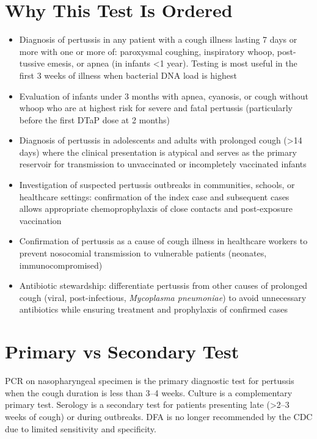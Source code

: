 \section*{Why This Test Is Ordered}
\begin{itemize}
  \item Diagnosis of pertussis in any patient with a cough illness lasting 7 days or more with one or more of: paroxysmal coughing, inspiratory whoop, post-tussive emesis, or apnea (in infants <1 year). Testing is most useful in the first 3 weeks of illness when bacterial DNA load is highest
  \item Evaluation of infants under 3 months with apnea, cyanosis, or cough without whoop who are at highest risk for severe and fatal pertussis (particularly before the first DTaP dose at 2 months)
  \item Diagnosis of pertussis in adolescents and adults with prolonged cough (>14 days) where the clinical presentation is atypical and serves as the primary reservoir for transmission to unvaccinated or incompletely vaccinated infants
  \item Investigation of suspected pertussis outbreaks in communities, schools, or healthcare settings: confirmation of the index case and subsequent cases allows appropriate chemoprophylaxis of close contacts and post-exposure vaccination
  \item Confirmation of pertussis as a cause of cough illness in healthcare workers to prevent nosocomial transmission to vulnerable patients (neonates, immunocompromised)
  \item Antibiotic stewardship: differentiate pertussis from other causes of prolonged cough (viral, post-infectious, \textit{Mycoplasma pneumoniae}) to avoid unnecessary antibiotics while ensuring treatment and prophylaxis of confirmed cases
\end{itemize}

\section*{Primary vs Secondary Test}
PCR on nasopharyngeal specimen is the primary diagnostic test for pertussis when the cough duration is less than 3--4 weeks. Culture is a complementary primary test. Serology is a secondary test for patients presenting late (>2--3 weeks of cough) or during outbreaks. DFA is no longer recommended by the CDC due to limited sensitivity and specificity.

